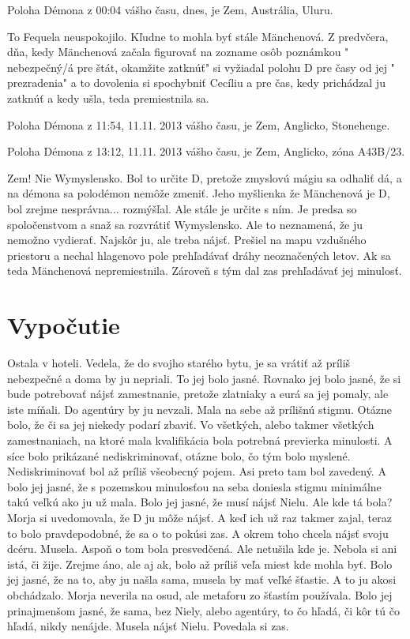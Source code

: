 \documentclass{book}
\begin{document}
Poloha Démona z 00:04 vášho času, dnes, je Zem, Austrália, Uluru.

To Fequela neuspokojilo. Kľudne to mohla byť stále Mänchenová. Z predvčera, dňa, kedy Mänchenová začala figurovať na zozname osôb poznámkou "$ $nebezpečný/á pre štát, okamžite zatknúť"$ $  si vyžiadal polohu D pre časy od jej "$ $prezradenia"$ $  a to dovolenia si spochybniť Cecíliu a pre čas, kedy prichádzal ju zatknúť a kedy ušla, teda premiestnila sa.

Poloha Démona z 11:54, 11.11. 2013 vášho času, je Zem, Anglicko, Stonehenge.

Poloha Démona z 13:12, 11.11. 2013 vášho času, je Zem, Anglicko, zóna A43B/23.

Zem! Nie Wymyslensko. Bol to určite D, pretože zmyslovú mágiu sa odhaliť dá, a na démona sa polodémon nemôže zmeniť. Jeho myšlienka že Mänchenová je D, bol zrejme nesprávna... rozmýšľal. Ale stále je určite s ním. Je predsa so spoločenstvom a snaž sa rozvrátiť Wymyslensko. Ale to neznamená, že ju nemožno vydierať. Najskôr ju, ale treba nájsť. Prešiel na mapu vzdušného priestoru a nechal hlagenovo pole prehľadávať dráhy neoznačených letov. Ak sa teda Mänchenová nepremiestnila. Zároveň s tým dal zas prehľadávať jej minulosť.

\chapter{Vypočutie}

Ostala v hoteli. Vedela, že do svojho starého bytu, je sa vrátiť až príliš nebezpečné a doma by ju nepriali. To jej bolo jasné. Rovnako jej bolo jasné, že si bude potrebovať nájsť zamestnanie, pretože zlatniaky a eurá sa jej pomaly, ale iste míňali. Do agentúry by ju nevzali. Mala na sebe až prílišnú stigmu. Otázne bolo, že či sa jej niekedy podarí zbaviť. Vo všetkých, alebo takmer všetkých zamestnaniach, na ktoré mala kvalifikácia bola potrebná previerka minulosti. A síce bolo prikázané nediskriminovať, otázne bolo, čo tým bolo myslené. Nediskriminovať bol až príliš všeobecný pojem. Asi preto tam bol zavedený. A bolo jej jasné, že s pozemskou minulosťou na seba doniesla stigmu minimálne takú veľkú ako ju už mala. Bolo jej jasné, že musí nájsť Nielu. Ale kde tá bola? Morja si uvedomovala, že D ju môže nájsť. A keď ich už raz takmer zajal, teraz to bolo pravdepodobné, že sa o to pokúsi zas. A okrem toho chcela nájsť svoju dcéru. Musela. Aspoň o tom bola presvedčená. Ale netušila kde je. Nebola si ani istá, či žije. Zrejme áno, ale aj ak, bolo až príliš veľa miest kde mohla byť. Bolo jej jasné, že na to, aby ju našla sama, musela by mať veľké šťastie. A to ju akosi obchádzalo. Morja neverila na osud, ale metaforu zo šťastím používala. Bolo jej prinajmenšom jasné, že sama, bez Niely, alebo agentúry, to čo hľadá, či kôr tú čo hľadá, nikdy nenájde. Musela nájsť Nielu. Povedala si zas.
\end{document}
